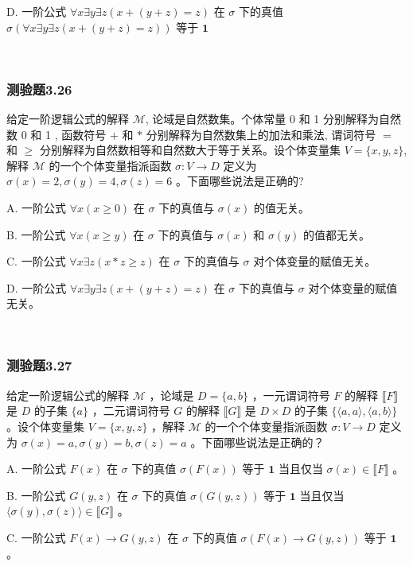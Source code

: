 \documentclass[UTF8, heading=true]{ctexart}
\begin{document}
D. 一阶公式 $\forall x \exists y \exists z(x+(y+z)=z)$ 在 $\sigma$ 下的真值 $\sigma(\forall x \exists y \exists z(x+(y+z)=z))$ 等于 $\mathbf{1}$

\textcolor{white}{答案：AC}

\subsubsection{测验题3.26}

给定一阶逻辑公式的解释 $\mathcal{M}$, 论域是自然数集。个体常量 0 和 1 分别解释为自然数 0 和 1 , 函数符号 $+$ 和 $*$ 分别解释为自然数集上的加法和乘法, 谓词符号 $=$ 和 $\geq$ 分别解释为自然数相等和自然数大于等于关系。设个体变量集 $V=\{x, y, z\}$, 解释 $\mathcal{M}$ 的一个个体变量指派函数 $\sigma: V \rightarrow D$ 定义为 $\sigma(x)=2, \sigma(y)=4, \sigma(z)=6$ 。下面哪些说法是正确的?

A. 一阶公式 $\forall x(x \geq 0)$ 在 $\sigma$ 下的真值与 $\sigma(x)$ 的值无关。

B.  一阶公式 $\forall x(x \geq y)$ 在 $\sigma$ 下的真值与 $\sigma(x)$ 和 $\sigma(y)$ 的值都无关。

C. 一阶公式 $\forall x \exists z(x * z \geq z)$ 在 $\sigma$ 下的真值与 $\sigma$ 对个体变量的赋值无关。

D. 一阶公式 $\forall x \exists y \exists z(x+(y+z)=z)$ 在 $\sigma$ 下的真值与 $\sigma$ 对个体变量的赋值无关。

\textcolor{white}{答案：ACD}

\subsubsection{测验题3.27}

给定一阶逻辑公式的解释 $\mathcal{M}$ ，论域是 $D=\{a, b\}$ ，一元谓词符号 $F$ 的解释 $\llbracket F\rrbracket$ 是 $D$ 的子集 $\{a\}$ ，二元谓词符号 $G$ 的解释 $\llbracket G \rrbracket$ 是 $D \times D$ 的子集 $\{\langle a, a\rangle,\langle a, b\rangle\}$ 。设个体变量集 $V=\{x, y, z\}$ ，解释 $\mathcal{M}$ 的一个个体变量指派函数 $\sigma: V \rightarrow D$ 定义为 $\sigma(x)=a, \sigma(y)=b, \sigma(z)=a$ 。下面哪些说法是正确的？

A. 一阶公式 $F(x)$ 在 $\sigma$ 下的真值 $\sigma(F(x))$ 等于 $\mathbf{1}$ 当且仅当 $\sigma(x) \in \llbracket F \rrbracket$ 。

B. 一阶公式 $G(y, z)$ 在 $\sigma$ 下的真值 $\sigma(G(y, z))$ 等于 $\mathbf{1}$ 当且仅当 $\langle\sigma(y), \sigma(z)\rangle \in \llbracket G \rrbracket$ 。

C. 一阶公式 $F(x) \rightarrow G(y, z)$ 在 $\sigma$ 下的真值 $\sigma(F(x) \rightarrow G(y, z))$ 等于 $\mathbf{1}$ 。
\end{document}
